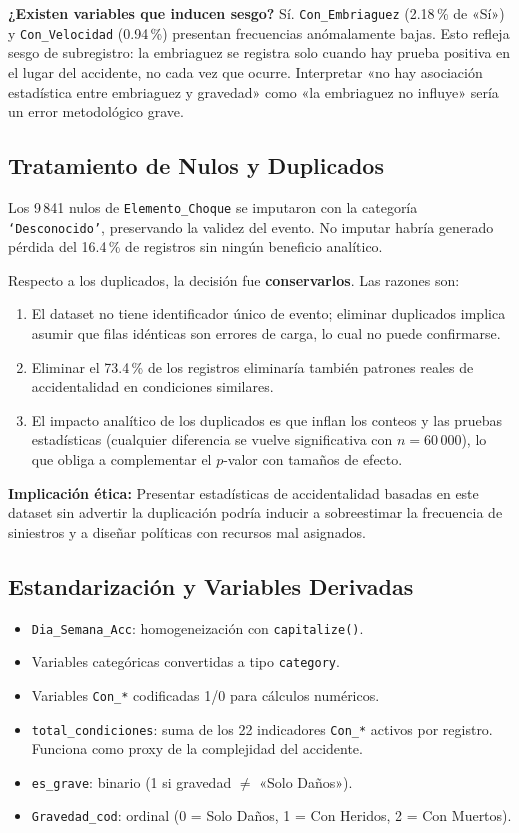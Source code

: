 \documentclass[11pt,a4paper]{article}
\begin{document}
\textbf{¿Existen variables que inducen sesgo?} Sí. \texttt{Con\_Embriaguez} (2.18\,\% de
«Sí») y \texttt{Con\_Velocidad} (0.94\,\%) presentan frecuencias anómalamente bajas. Esto
refleja sesgo de subregistro: la embriaguez se registra solo cuando hay prueba positiva en
el lugar del accidente, no cada vez que ocurre. Interpretar «no hay asociación estadística
entre embriaguez y gravedad» como «la embriaguez no influye» sería un error metodológico
grave.

\subsection{Tratamiento de Nulos y Duplicados}

Los 9\,841 nulos de \texttt{Elemento\_Choque} se imputaron con la categoría
\texttt{`Desconocido'}, preservando la validez del evento. No imputar habría generado
pérdida del 16.4\,\% de registros sin ningún beneficio analítico.

Respecto a los duplicados, la decisión fue \textbf{conservarlos}. Las razones son:
\begin{enumerate}
  \item El dataset no tiene identificador único de evento; eliminar duplicados implica asumir
        que filas idénticas son errores de carga, lo cual no puede confirmarse.
  \item Eliminar el 73.4\,\% de los registros eliminaría también patrones reales de
        accidentalidad en condiciones similares.
  \item El impacto analítico de los duplicados es que inflan los conteos y las pruebas
        estadísticas (cualquier diferencia se vuelve significativa con $n = 60\,000$), lo
        que obliga a complementar el $p$-valor con tamaños de efecto.
\end{enumerate}

\textbf{Implicación ética:} Presentar estadísticas de accidentalidad basadas en este
dataset sin advertir la duplicación podría inducir a sobreestimar la frecuencia de
siniestros y a diseñar políticas con recursos mal asignados.

\subsection{Estandarización y Variables Derivadas}

\begin{itemize}
  \item \texttt{Dia\_Semana\_Acc}: homogeneización con \texttt{capitalize()}.
  \item Variables categóricas convertidas a tipo \texttt{category}.
  \item Variables \texttt{Con\_*} codificadas 1/0 para cálculos numéricos.
  \item \texttt{total\_condiciones}: suma de los 22 indicadores \texttt{Con\_*} activos por
        registro. Funciona como proxy de la complejidad del accidente.
  \item \texttt{es\_grave}: binario (1 si gravedad $\neq$ «Solo Daños»).
  \item \texttt{Gravedad\_cod}: ordinal (0 = Solo Daños, 1 = Con Heridos, 2 = Con
        Muertos).
\end{itemize}
\end{document}
